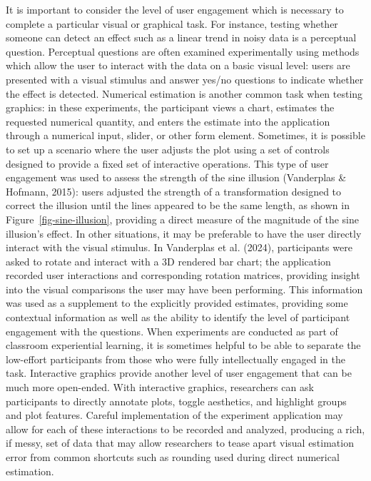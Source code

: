 \documentclass[
  10pt,
  letterpaper,
  DIV=11,
  numbers=noendperiod]{scrartcl}
\begin{document}
It is important to consider the level of user engagement which is
necessary to complete a particular visual or graphical task. For
instance, testing whether someone can detect an effect such as a linear
trend in noisy data is a perceptual question. Perceptual questions are
often examined experimentally using methods which allow the user to
interact with the data on a basic visual level: users are presented with
a visual stimulus and answer yes/no questions to indicate whether the
effect is detected. Numerical estimation is another common task when
testing graphics: in these experiments, the participant views a chart,
estimates the requested numerical quantity, and enters the estimate into
the application through a numerical input, slider, or other form
element. Sometimes, it is possible to set up a scenario where the user
adjusts the plot using a set of controls designed to provide a fixed set
of interactive operations. This type of user engagement was used to
assess the strength of the sine illusion (Vanderplas \& Hofmann, 2015):
users adjusted the strength of a transformation designed to correct the
illusion until the lines appeared to be the same length, as shown in
Figure~\ref{fig-sine-illusion}, providing a direct measure of the
magnitude of the sine illusion's effect. In other situations, it may be
preferable to have the user directly interact with the visual stimulus.
In Vanderplas et al. (2024), participants were asked to rotate and
interact with a 3D rendered bar chart; the application recorded user
interactions and corresponding rotation matrices, providing insight into
the visual comparisons the user may have been performing. This
information was used as a supplement to the explicitly provided
estimates, providing some contextual information as well as the ability
to identify the level of participant engagement with the questions. When
experiments are conducted as part of classroom experiential learning, it
is sometimes helpful to be able to separate the low-effort participants
from those who were fully intellectually engaged in the task.
Interactive graphics provide another level of user engagement that can
be much more open-ended. With interactive graphics, researchers can ask
participants to directly annotate plots, toggle aesthetics, and
highlight groups and plot features. Careful implementation of the
experiment application may allow for each of these interactions to be
recorded and analyzed, producing a rich, if messy, set of data that may
allow researchers to tease apart visual estimation error from common
shortcuts such as rounding used during direct numerical estimation.
\end{document}
